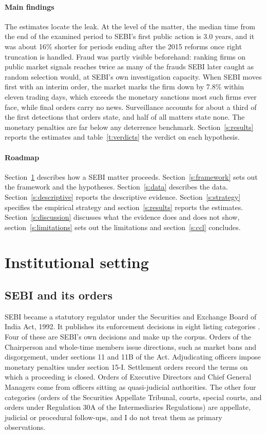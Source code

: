 \documentclass[letterpaper,11pt,leqno]{article}
\begin{document}
\paragraph{Main findings} The estimates locate the leak. At the level of the matter, the median time from the end of the examined period to SEBI's first public action is 3.0 years, and it was about 16\% shorter for periods ending after the 2015 reforms once right truncation is handled. Fraud was partly visible beforehand: ranking firms on public market signals reaches twice as many of the frauds SEBI later caught as random selection would, at SEBI's own investigation capacity. When SEBI moves first with an interim order, the market marks the firm down by 7.8\% within eleven trading days, which exceeds the monetary sanctions most such firms ever face, while final orders carry no news. Surveillance accounts for about a third of the first detections that orders state, and half of all matters state none. The monetary penalties are far below any deterrence benchmark. Section~\ref{s:results} reports the estimates and table~\ref{t:verdicts} the verdict on each hypothesis.

\paragraph{Roadmap} Section~\ref{s:institutions} describes how a SEBI matter proceeds. Section~\ref{s:framework} sets out the framework and the hypotheses. Section~\ref{s:data} describes the data. Section~\ref{s:descriptive} reports the descriptive evidence. Section~\ref{s:strategy} specifies the empirical strategy and section~\ref{s:results} reports the estimates. Section~\ref{s:discussion} discusses what the evidence does and does not show, section~\ref{s:limitations} sets out the limitations and section~\ref{s:ccl} concludes.

\section{Institutional setting}\label{s:institutions}

\subsection{SEBI and its orders}

SEBI became a statutory regulator under the Securities and Exchange Board of India Act, 1992. It publishes its enforcement decisions in eight listing categories \citep{SEBI26b}. Four of these are SEBI's own decisions and make up the corpus. Orders of the Chairperson and whole-time members issue directions, such as market bans and disgorgement, under sections 11 and 11B of the Act. Adjudicating officers impose monetary penalties under section 15-I. Settlement orders record the terms on which a proceeding is closed. Orders of Executive Directors and Chief General Managers come from officers sitting as quasi-judicial authorities. The other four categories (orders of the Securities Appellate Tribunal, courts, special courts, and orders under Regulation 30A of the Intermediaries Regulations) are appellate, judicial or procedural follow-ups, and I do not treat them as primary observations.
\end{document}
